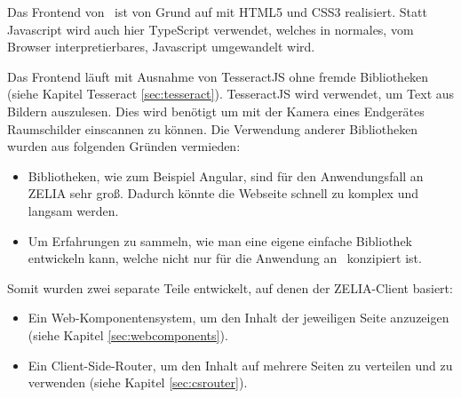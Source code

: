Das Frontend von \ZELIA\ ist von Grund auf mit HTML5 und CSS3 realisiert. Statt Javascript wird auch hier TypeScript verwendet, welches in normales, vom Browser interpretierbares, Javascript umgewandelt wird. 

Das Frontend läuft mit Ausnahme von TesseractJS ohne fremde Bibliotheken (siehe Kapitel Tesseract \ref{sec:tesseract}). TesseractJS wird verwendet, um Text aus Bildern auszulesen. Dies wird benötigt um mit der Kamera eines Endgerätes Raumschilder einscannen zu können. Die Verwendung anderer Bibliotheken wurden aus folgenden Gründen vermieden:
\begin{itemize}
    \item Bibliotheken, wie zum Beispiel Angular, sind für den Anwendungsfall an ZELIA sehr groß. Dadurch könnte die Webseite schnell zu komplex und langsam werden.
    \item Um Erfahrungen zu sammeln, wie man eine eigene einfache Bibliothek entwickeln kann, welche nicht nur für die Anwendung an \ZELIA\ konzipiert ist.
\end{itemize}

\begin{minipage}{\textwidth}
    Somit wurden zwei separate Teile entwickelt, auf denen der ZELIA-Client basiert:
    
    \begin{itemize}
        \item Ein Web-Komponentensystem, um den Inhalt der jeweiligen Seite anzuzeigen (siehe Kapitel \ref{sec:webcomponents}).
        \item Ein Client-Side-Router, um den Inhalt auf mehrere Seiten zu verteilen und zu verwenden (siehe Kapitel \ref{sec:csrouter}).
    \end{itemize}
\end{minipage}
